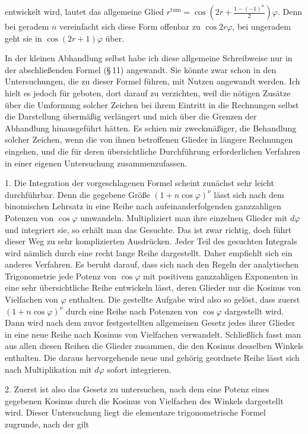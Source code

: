 entwickelt wird, lautet das allgemeine Glied $r^{\text{tum}} = \cos\left(2r+\frac{1-(-1)^n}{2}\right)\varphi$. Denn bei geradem $n$ vereinfacht sich diese Form offenbar zu $\cos 2r\varphi$, bei ungeradem geht sie in $\cos(2r+1)\varphi$ über.

In der kleinen Abhandlung selbst habe ich diese allgemeine Schreibweise nur in der abschließenden Formel (\S\,11) angewandt. Sie könnte zwar schon in den Untersuchungen, die zu dieser Formel führen, mit Nutzen angewandt werden. Ich hielt es jedoch für geboten, dort darauf zu verzichten, weil die nötigen Zusätze über die Umformung solcher Zeichen bei ihrem Eintritt in die Rechnungen selbst die Darstellung übermäßig verlängert und mich über die Grenzen der Abhandlung hinausgeführt hätten. Es schien mir zweckmäßiger, die Behandlung solcher Zeichen, wenn die von ihnen betroffenen Glieder in längere Rechnungen eingehen, und die für deren übersichtliche Durchführung erforderlichen Verfahren in einer eigenen Untersuchung zusammenzufassen.

1. Die Integration der vorgeschlagenen Formel scheint zunächst sehr leicht durchführbar. Denn die gegebene Größe $(1+n\cos\varphi)^\nu$ lässt sich nach dem binomischen Lehrsatz in eine Reihe nach aufeinanderfolgenden ganzzahligen Potenzen von $\cos\varphi$ umwandeln. Multipliziert man ihre einzelnen Glieder mit $d\varphi$ und integriert sie, so erhält man das Gesuchte. Das ist zwar richtig, doch führt dieser Weg zu sehr komplizierten Ausdrücken. Jeder Teil des gesuchten Integrals wird nämlich durch eine recht lange Reihe dargestellt. Daher empfiehlt sich ein anderes Verfahren. Es beruht darauf, dass sich nach den Regeln der analytischen Trigonometrie jede Potenz von $\cos\varphi$ mit positivem ganzzahligen Exponenten in eine sehr übersichtliche Reihe entwickeln lässt, deren Glieder nur die Kosinus von Vielfachen von $\varphi$ enthalten. Die gestellte Aufgabe wird also so gelöst, dass zuerst $(1+n\cos\varphi)^\nu$ durch eine Reihe nach Potenzen von $\cos\varphi$ dargestellt wird. Dann wird nach dem zuvor festgestellten allgemeinen Gesetz jedes ihrer Glieder in eine neue Reihe nach Kosinus von Vielfachen verwandelt. Schließlich fasst man aus allen diesen Reihen die Glieder zusammen, die den Kosinus desselben Winkels enthalten. Die daraus hervorgehende neue und gehörig geordnete Reihe lässt sich nach Multiplikation mit $d\varphi$ sofort integrieren.

2. Zuerst ist also das Gesetz zu untersuchen, nach dem eine Potenz eines gegebenen Kosinus durch die Kosinus von Vielfachen des Winkels dargestellt wird. Dieser Untersuchung liegt die elementare trigonometrische Formel zugrunde, nach der gilt
